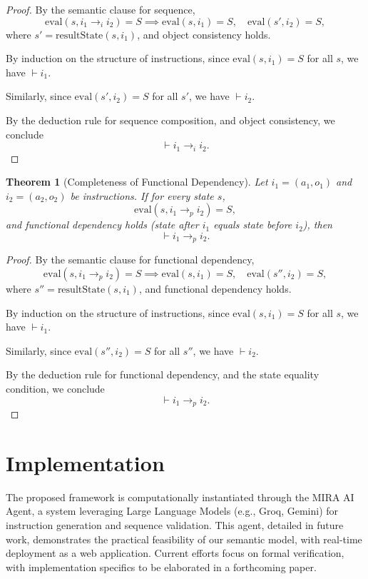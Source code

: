 \documentclass[a4paper,11pt]{lmcs}
\newtheorem{theorem}{Theorem}
\begin{document}
\begin{proof}
By the semantic clause for sequence,
\[
\text{eval}(s, i_1 \rightarrow_i i_2) = S \implies \text{eval}(s, i_1) = S, \quad \text{eval}(s', i_2) = S,
\]
where $s' = \text{resultState}(s, i_1)$, and object consistency holds.

By induction on the structure of instructions, since $\text{eval}(s, i_1) = S$ for all $s$, we have $\vdash i_1$.

Similarly, since $\text{eval}(s', i_2) = S$ for all $s'$, we have $\vdash i_2$.

By the deduction rule for sequence composition, and object consistency, we conclude
\[
\vdash i_1 \rightarrow_i i_2.
\]
\end{proof}
\begin{theorem}[Completeness of Functional Dependency]
Let $i_1 = (a_1, o_1)$ and $i_2 = (a_2, o_2)$ be instructions. If for every state $s$,
\[
\text{eval}(s, i_1 \rightarrow_p i_2) = S,
\]
and functional dependency holds (state after $i_1$ equals state before $i_2$), then
\[
\vdash i_1 \rightarrow_p i_2.
\]
\end{theorem}

\begin{proof}
By the semantic clause for functional dependency,
\[
\text{eval}(s, i_1 \rightarrow_p i_2) = S \implies \text{eval}(s, i_1) = S, \quad \text{eval}(s'', i_2) = S,
\]
where $s'' = \text{resultState}(s, i_1)$, and functional dependency holds.

By induction on the structure of instructions, since $\text{eval}(s, i_1) = S$ for all $s$, we have $\vdash i_1$.

Similarly, since $\text{eval}(s'', i_2) = S$ for all $s''$, we have $\vdash i_2$.

By the deduction rule for functional dependency, and the state equality condition, we conclude
\[
\vdash i_1 \rightarrow_p i_2.
\]
\end{proof}





\section{Implementation}
The proposed framework is computationally instantiated through the MIRA AI Agent, a system leveraging Large Language Models (e.g., Groq, Gemini) for instruction generation and sequence validation. This agent, detailed in future work, demonstrates the practical feasibility of our semantic model, with real-time deployment as a web application. Current efforts focus on formal verification, with implementation specifics to be elaborated in a forthcoming paper.
\end{document}
